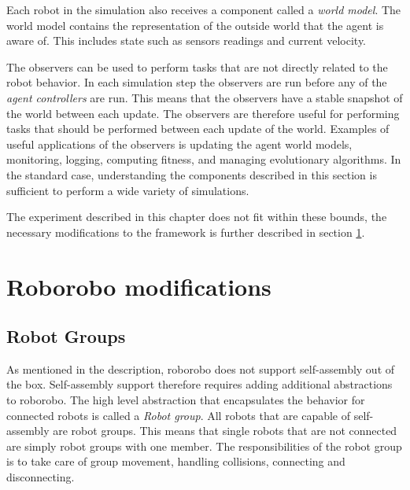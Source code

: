 Each robot in the simulation also receives a component called a \emph{world model}.
The world model contains the representation of the outside world that the agent is aware of.
This includes state such as sensors readings and current velocity.

The observers can be used to perform tasks that are not directly related to the robot behavior.
In each simulation step the observers are run before any of the \emph{agent controllers} are run.
This means that the observers have a stable snapshot of the world between each update.
The observers are therefore useful for performing tasks that should be performed between each update of the world.
Examples of useful applications of the observers is updating the agent world models, monitoring, logging, computing fitness, and managing evolutionary algorithms.
In the standard case, understanding the components described in this section is sufficient to perform a wide variety of simulations.


The experiment described in this chapter does not fit within these bounds, the necessary modifications to the framework is further described in section \ref{sec:modifications}.



\section{Roborobo modifications}
\label{sec:modifications}
	\subsection{Robot Groups}
	As mentioned in the description, roborobo does not support self-assembly out of the box.
	Self-assembly support therefore requires adding additional abstractions to roborobo.
	The high level abstraction that encapsulates the behavior for connected robots is called a \emph{Robot group}.
	All robots that are capable of self-assembly are robot groups.
	This means that single robots that are not connected are simply robot groups with one member.
	The responsibilities of the robot group is to take care of group movement, handling collisions, connecting and disconnecting. 
